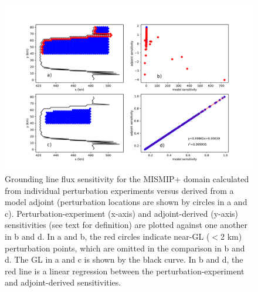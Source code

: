 \documentclass[review,oneside]{igs}
\begin{document}
\begin{figure}
	\centering
    \includegraphics[width=1\linewidth]{figs/fig9.pdf}
    \caption{Grounding line flux sensitivity for the MISMIP+ domain calculated from individual perturbation experiments versus derived from a model adjoint (perturbation locations are shown by circles in a and c). Perturbation-experiment (x-axis) and adjoint-derived (y-axis) sensitivities (see text for definition) are plotted against one another in b and d. In a and b, the red circles indicate near-GL ($<$2 km) perturbation points, which are omitted in the comparison in b and d. The GL in a and c is shown by the black curve. In b and d, the red line is a linear regression between the perturbation-experiment and adjoint-derived sensitivities.}
	\label{fig9}
\end{figure}



\end{document}
